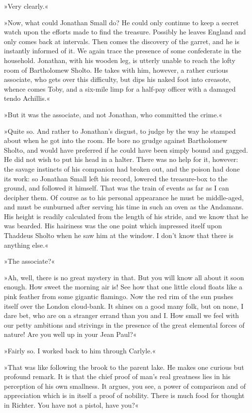 »Very clearly.«

»Now, what could Jonathan Small do? He could only continue to keep a secret watch upon the efforts made to find the treasure. Possibly he leaves England and only comes back at intervals. Then comes the discovery of the garret, and he is instantly informed of it. We again trace the presence of some confederate in the household. Jonathan, with his wooden leg, is utterly unable to reach the lofty room of Bartholomew Sholto. He takes with him, however, a rather curious associate, who gets over this difficulty, but dips his naked foot into creasote, whence comes Toby, and a six-mile limp for a half-pay officer with a damaged tendo Achillis.«

»But it was the associate, and not Jonathan, who committed the crime.«

»Quite so. And rather to Jonathan's disgust, to judge by the way he stamped about when he got into the room. He bore no grudge against Bartholomew Sholto, and would have preferred if he could have been simply bound and gagged. He did not wish to put his head in a halter. There was no help for it, however: the savage instincts of his companion had broken out, and the poison had done its work: so Jonathan Small left his record, lowered the treasure-box to the ground, and followed it himself. That was the train of events as far as I can decipher them. Of course as to his personal appearance he must be middle-aged, and must be sunburned after serving his time in such an oven as the Andamans. His height is readily calculated from the length of his stride, and we know that he was bearded. His hairiness was the one point which impressed itself upon Thaddeus Sholto when he saw him at the window. I don't know that there is anything else.«

»The associate?«

»Ah, well, there is no great mystery in that. But you will know all about it soon enough. How sweet the morning air is! See how that one little cloud floats like a pink feather from some gigantic flamingo. Now the red rim of the sun pushes itself over the London cloud-bank. It shines on a good many folk, but on none, I dare bet, who are on a stranger errand than you and I. How small we feel with our petty ambitions and strivings in the presence of the great elemental forces of nature! Are you well up in your Jean Paul?«

»Fairly so. I worked back to him through Carlyle.«

»That was like following the brook to the parent lake. He makes one curious but profound remark. It is that the chief proof of man's real greatness lies in his perception of his own smallness. It argues, you see, a power of comparison and of appreciation which is in itself a proof of nobility. There is much food for thought in Richter. You have not a pistol, have you?«

